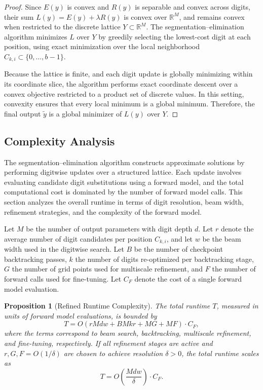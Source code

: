 \documentclass[aps,twocolumn,superscriptaddress,nofootinbib]{revtex4}
\newtheorem{proposition}{Proposition}
\begin{document}
\begin{proof}
Since \( E(y) \) is convex and \( R(y) \) is separable and convex across digits, their sum \( L(y) = E(y) + \lambda R(y) \) is convex over \( \mathbb{R}^M \), and remains convex when restricted to the discrete lattice \( Y \subset \mathbb{R}^M \). The segmentation--elimination algorithm minimizes \( L \) over \( Y \) by greedily selecting the lowest-cost digit at each position, using exact minimization over the local neighborhood \( C_{k,i} \subset \{0, \dots, b-1\} \).

Because the lattice is finite, and each digit update is globally minimizing within its coordinate slice, the algorithm performs exact coordinate descent over a convex objective restricted to a product set of discrete values. In this setting, convexity ensures that every local minimum is a global minimum. Therefore, the final output \( \tilde{y} \) is a global minimizer of \( L(y) \) over \( Y \).

\end{proof}

\subsection{Complexity Analysis}

The segmentation--elimination algorithm constructs approximate solutions by performing digitwise updates over a structured lattice. Each update involves evaluating candidate digit substitutions using a forward model, and the total computational cost is dominated by the number of forward model calls. This section analyzes the overall runtime in terms of digit resolution, beam width, refinement strategies, and the complexity of the forward model.

Let $M$ be the number of output parameters with digit depth $d$. Let $r$ denote the average number of digit candidates per position $C_{k,i}$, and let $w$ be the beam width used in the digitwise search. Let $B$ be the number of checkpoint backtracking passes, $k$ the number of digits re-optimized per backtracking stage, $G$ the number of grid points used for multiscale refinement, and $F$ the number of forward calls used for fine-tuning. Let $C_F$ denote the cost of a single forward model evaluation.

\begin{proposition}[Refined Runtime Complexity]
The total runtime $T$, measured in units of forward model evaluations, is bounded by
\begin{equation}
    T = O\left(r M d w + B M k r + M G + M F\right) \cdot C_F, \label{eq:total-runtime}
\end{equation}
where the terms correspond to beam search, backtracking, multiscale refinement, and fine-tuning, respectively. If all refinement stages are active and $r, G, F = O(1/\delta)$ are chosen to achieve resolution $\delta > 0$, the total runtime scales as
\begin{equation}
    T = O\left(\frac{M d w}{\delta} \right) \cdot C_F. \label{eq:asymptotic-runtime}
\end{equation}
\end{proposition}
\end{document}
